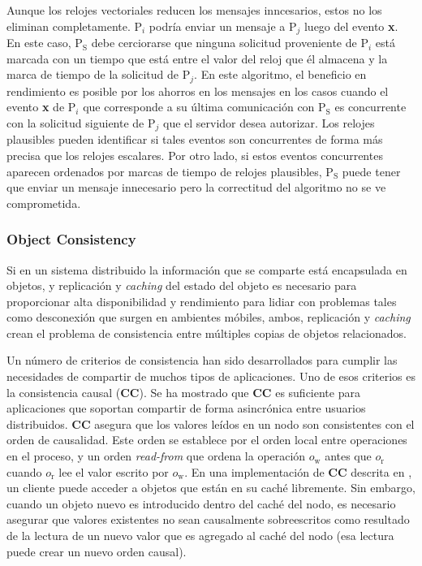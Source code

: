 \documentclass[12pt, times]{simauth}
\begin{document}
Aunque los relojes vectoriales reducen los mensajes inncesarios, estos no los eliminan completamente. P$_i$ podría enviar un mensaje a P$_j$ luego del evento \textbf{x}. En este caso, P$_{\text{S}}$ debe cerciorarse que ninguna solicitud proveniente de P$_i$ está marcada con un tiempo que está entre el valor del reloj que él almacena y la marca de tiempo de la solicitud de P$_j$. En este algoritmo, el beneficio en rendimiento es posible por los ahorros en los mensajes en los casos cuando el evento \textbf{x} de P$_i$ que corresponde a su última comunicación con P$_{\text{S}}$ es concurrente con la solicitud siguiente de P$_j$ que el servidor desea autorizar. Los relojes plausibles pueden identificar si tales eventos son concurrentes de forma más precisa que los relojes escalares. Por otro lado, si estos eventos concurrentes aparecen ordenados por marcas de tiempo de relojes plausibles, P$_{\text{S}}$ puede tener que enviar un mensaje innecesario pero la correctitud del algoritmo no se ve comprometida.

\subsubsection{Object Consistency}
Si en un sistema distribuido la información que se comparte está encapsulada en objetos, y replicación y \emph{caching} del estado del objeto es necesario para proporcionar alta disponibilidad y rendimiento para lidiar con problemas tales como desconexión que surgen en ambientes móbiles, ambos, replicación y \emph{caching} crean el problema de consistencia entre múltiples copias de objetos relacionados.

Un número de criterios de consistencia han sido desarrollados para cumplir las necesidades de compartir de muchos tipos de aplicaciones. Uno de esos criterios es la consistencia causal (\textbf{CC}). Se ha mostrado que \textbf{CC} es suficiente para aplicaciones que soportan compartir de forma asincrónica entre usuarios distribuidos. \textbf{CC} asegura que los valores leídos en un nodo son consistentes con el orden de causalidad. Este orden se establece por el orden local entre operaciones en el proceso, y un orden \emph{read-from} que ordena la operación $o_{\text{w}}$ antes que $o_{\text{r}}$ cuando $o_{\text{r}}$ lee el valor escrito por $o_{\text{w}}$. En una implementación de \textbf{CC} descrita en \cite{john}, un cliente puede acceder a objetos que están en su caché libremente. Sin embargo, cuando un objeto nuevo es introducido dentro del caché del nodo, es necesario asegurar que valores existentes no sean causalmente sobreescritos como resultado de la lectura de un nuevo valor que es agregado al caché del nodo (esa lectura puede crear un nuevo orden causal).
\end{document}
